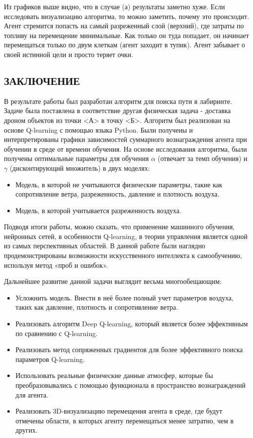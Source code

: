 \documentclass[a4paper]{report}
\theoremstyle{definition}
\theoremstyle{plain}
\theoremstyle{remark}
\theoremstyle{remark}
\theoremstyle{definition}
\begin{document}
Из графиков выше видно, что в случае (а) результаты заметно хуже. Если исследовать визуализацию алгоритма, то можно заметить, почему это происходит. Агент стремится попасть на самый разреженный слой (верхний), где затраты по топливу на перемещение минимальные. Как только он туда попадает, он начинает перемещаться только по двум клеткам (агент заходит в тупик). Агент забывает о своей истинной цели и просто теряет очки.

\newpage
\begin{center}
    \section*{ЗАКЛЮЧЕНИЕ}
\end{center}

В результате работы был разработан алгоритм для поиска пути в лабиринте. Задаче была поставлена в соответствие другая физическая задача - доставка дроном объектов из точки <А> в точку <Б>. Алгоритм был реализован на основе Q-learning с помощью языка Python. Были получены и интерпретированы графики зависимостей суммарного вознаграждения агента при обучении в среде от времени обучения. На основе исследования алгоритма, были получены оптимальные параметры для обучения $\alpha$ (отвечает за темп обучения) и $\gamma$ (дисконтирующий множитель) в двух моделях:
\begin{itemize}
    \item Модель, в которой не учитываются физические параметры, такие как сопротивление ветра, разреженность, давление и плотность воздуха.
    \item Модель, в которой учитывается разреженность воздуха.
\end{itemize}

Подводя итоги работы, можно сказать, что применение машинного обучения, нейронных сетей, в особенности Q-learning, в теории управления является одной из самых перспективных областей. В данной работе были наглядно продемонстрированы возможности искусственного интеллекта к самообучению, используя метод «проб и ошибок».

Дальнейшее развитие данной задачи выглядит весьма многообещающим:
\begin{itemize}
    \item Усложнить модель. Внести в неё более полный учет параметров воздуха, таких как давление, плотность и сопротивление ветра.
    \item Реализовать алгоритм Deep Q-learning, который является более эффективным по сравнению с Q-learning.
    \item Реализовать метод сопряженных градиентов для более эффективного поиска параметров Q-learning.
    \item Использовать реальные физические данные атмосфер, которые бы преобразовывались с помощью функционала в пространство вознаграждений для агента.
     \item Реализовать 3D-визуализацию перемещения агента в среде, где будут отмечены области, в которых агенту перемещаться менее затратно, чем в других.
\end{itemize}
\end{document}
